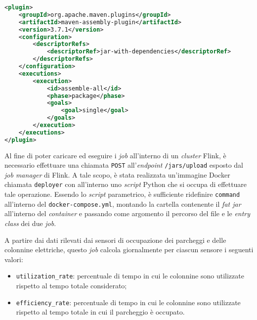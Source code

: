 \begin{lstlisting}[language=XML, caption=Configurazione del \textit{plugin} \texttt{maven-assembly-plugin} per la creazione del \textit{fat jar},captionpos=b]
<plugin>
    <groupId>org.apache.maven.plugins</groupId>
    <artifactId>maven-assembly-plugin</artifactId>
    <version>3.7.1</version>
    <configuration>
        <descriptorRefs>
            <descriptorRef>jar-with-dependencies</descriptorRef>
        </descriptorRefs>
    </configuration>
    <executions>
        <execution>
            <id>assemble-all</id>
            <phase>package</phase>
            <goals>
                <goal>single</goal>
            </goals>
        </execution>
    </executions>
</plugin>
\end{lstlisting}
Al fine di poter caricare ed eseguire i \textit{job} all'interno di un \textit{cluster} Flink, è necessario effettuare una chiamata \texttt{POST} all'\textit{endpoint} \texttt{/jars/upload}
esposto dal \textit{job manager} di Flink. A tale scopo, è stata realizzata un'immagine Docker chiamata \texttt{deployer} con all'interno uno \textit{script}
Python che si occupa di effettuare tale operazione. Essendo lo \textit{script} parametrico, è sufficiente ridefinire \texttt{command} all'interno del \texttt{docker-compose.yml},
montando la cartella contenente il \textit{fat jar} all'interno del \textit{container} e passando come argomento il percorso del file e le \textit{entry class} dei due \textit{job}.

A partire dai dati rilevati dai sensori di occupazione dei parcheggi e delle colonnine elettriche, questo \textit{job} calcola giornalmente per ciascun sensore i seguenti valori:
\begin{itemize}
	\item \texttt{utilization\_rate}: percentuale di tempo in cui le colonnine sono utilizzate rispetto al tempo totale considerato;
	\item \texttt{efficiency\_rate}: percentuale di tempo in cui le colonnine sono utilizzate rispetto al tempo totale in cui il parcheggio è occupato.
\end{itemize}


